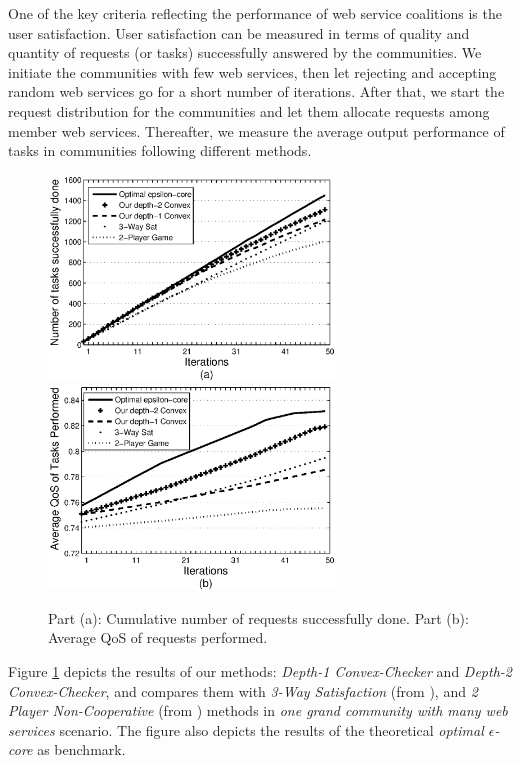\documentclass[10pt,journal,cspaper,compsoc]{IEEEtran}
\begin{document}
One of the key criteria reflecting the performance of web service
coalitions is the user satisfaction. User satisfaction can be
measured in terms of quality and quantity of requests (or tasks)
successfully answered by the communities. We initiate the
communities with few web services, then let rejecting and
accepting random web services go for a short number of iterations.
After that, we start the request distribution for the communities
and let them allocate requests among member web services.
Thereafter, we measure the average output performance of tasks in
communities following different methods.

\begin{figure}%
\centering
\includegraphics[width=3in]{task_done_opt.eps}
\includegraphics[width=3in]{task_qos_opt.eps}
\caption{Part (a): Cumulative number of requests successfully
done. Part (b): Average QoS of requests performed.}
\label{performanceall}
\end{figure}

Figure \ref{performanceall} depicts the results of our methods:
\emph{Depth-1 Convex-Checker} and \emph{Depth-2 Convex-Checker},
and compares them with \emph{3-Way Satisfaction} (from
\cite{DBLP:conf/IEEEscc/LimTMB12}), and \emph{2 Player
Non-Cooperative} (from \cite{DBLP:conf/IEEEscc/KhosravifarABT11})
methods in \emph{one grand community with many web services}
scenario. The figure also depicts the results of the theoretical
\emph{optimal $\epsilon$-core} as benchmark.
\end{document}
